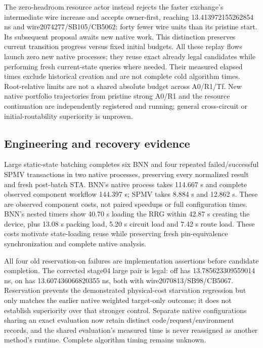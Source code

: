 The zero-headroom resource actor instead rejects the faster exchange's intermediate wire increase and accepts owner-first, reaching 13.413972155262854 ns and wire2074277/SB105/CB5062: forty fewer wire units than its pristine start. Its subsequent proposal awaits new native work. This distinction preserves current transition progress versus fixed initial budgets. All these replay flows launch zero new native processes; they reuse exact already legal candidates while performing fresh current-state queries where needed. Their measured elapsed times exclude historical creation and are not complete cold algorithm times. Root-relative limits are not a shared absolute budget across A0/R1/Tf. New native portfolio trajectories from pristine strong A0/R1 and the resource continuation are independently registered and running; general cross-circuit or initial-routability superiority is unproven.

\subsection{Engineering and recovery evidence}
Large static-state batching completes six BNN and four repeated failed/successful SPMV transactions in two native processes, preserving every normalized result and fresh post-batch STA. BNN's native process takes 114.667 s and complete observed component workflow 144.397 s; SPMV takes 8.884 s and 12.862 s. These are observed component costs, not paired speedups or full configuration times. BNN's nested timers show 40.70 s loading the RRG within 42.87 s creating the device, plus 13.08 s packing load, 5.20 s circuit load and 7.42 s route load. These costs motivate state-loading reuse while preserving fresh pin-equivalence synchronization and complete native analysis.

All four old reservation-on failures are implementation assertions before candidate completion. The corrected stage04 large pair is legal: off has 13.785623309559014 ns, on has 13.607436066820355 ns, both with wire2070813/SB98/CB5067. Reservation prevents the demonstrated physical-cost starvation regression but only matches the earlier native weighted target-only outcome; it does not establish superiority over that stronger control. Separate native configurations sharing an exact evaluation now retain distinct code/request/environment records, and the shared evaluation's measured time is never reassigned as another method's runtime. Complete algorithm timing remains unknown.
